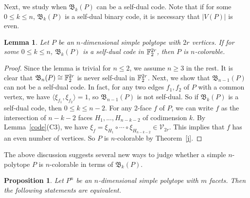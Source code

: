 \documentclass[12pt]{amsart}
\theoremstyle{plain} \numberwithin{equation}{section}
\newtheorem{prop}[thm]{Proposition}
\newtheorem{lem}[thm]{Lemma}
\theoremstyle{definition}
\theoremstyle{remark}
\begin{document}
 Next, we study when $\mathfrak{B}_k(P)$ can be a self-dual code. 
 Note that if for some $0\leq k\leq n$, $\mathfrak{B}_k(P)$ is a self-dual binary code, 
 it is necessary that $|V(P)|$ is even.

\begin{lem} \label{Lem:Polytope-Colorable}
 Let $P$ be an $n$-dimensional simple polytope with $2r$ vertices. 
 If for some $0\leq k \leq n$, $\mathfrak{B}_k(P)$ is a self-dual code in ${\Bbb F}^{2r}_2$,
  then $P$ is $n$-colorable.
\end{lem}

\begin{proof}
 Since the lemma is trivial for $n\leq 2$, we assume $n\geq 3$ in the rest. 
 It is clear that $\mathfrak{B}_n(P)\cong {\Bbb F}^{2r}_2$
 is never self-dual in ${\Bbb F}^{2r}_2$.
 Next, we show that $\mathfrak{B}_{n-1}(P)$ can not be a self-dual code. In fact, for any
two edges $f_1, f_2$ of $P$ with a common vertex, we have
$\langle \xi_{f_1}, \xi_{f_2} \rangle =1$, so $\mathfrak{B}_{n-1}(P)$ is not
self-dual. So if $\mathfrak{B}_k(P)$ is a self-dual code, then $0 \leq k \leq n-2$. 
For any 2-face $f$ of $P$, we can write $f$ as the intersection of
$n-k-2$ faces $H_1, ..., H_{n-k-2}$ of codimension $k$. By Lemma~\ref{code}(C3), 
 we have $\xi_f=\xi_{H_1}\circ \cdots\circ \xi_{H_{n-k-2}}\in \mathcal{V}_{2r}$. This implies 
 that $f$ has an even number of vertices. So $P$ is $n$-colorable by Theorem~\ref{j}.
\end{proof}

 The above discussion suggests several new ways to judge whether
 a simple $n$-polytope $P$ is $n$-colorable in terms of 
 $\mathfrak{B}_k(P)$.

\begin{prop}\label{collection}
Let $P^n$ be an $n$-dimensional simple polytope with $m$ facets. 
Then the following statements are equivalent.
\end{prop}
\end{document}
